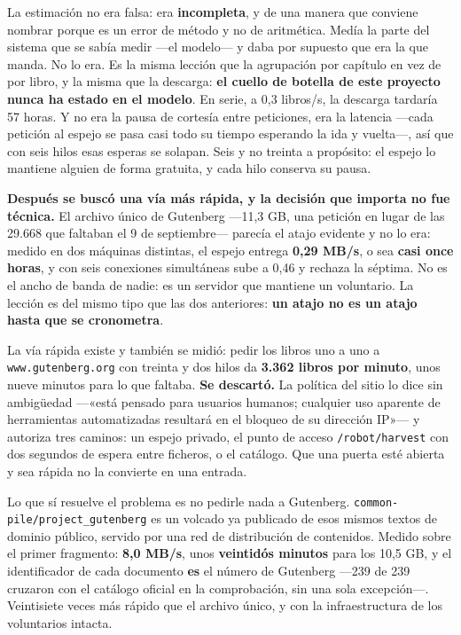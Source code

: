 \documentclass[11pt,a4paper]{article}
\begin{document}
\medskip
\noindent La estimación no era falsa: era \textbf{incompleta}, y de una manera que
conviene nombrar porque es un error de método y no de aritmética. Medía la parte del
sistema que se sabía medir —el modelo— y daba por supuesto que era la que manda. No lo
era. Es la misma lección que la agrupación por capítulo en vez de por libro, y la misma
que la descarga: \textbf{el cuello de botella de este proyecto nunca ha estado en el
modelo}. En serie, a 0,3 libros/s, la descarga tardaría 57 horas. Y no
era la pausa de cortesía entre peticiones, era la latencia —cada petición al espejo se
pasa casi todo su tiempo esperando la ida y vuelta—, así que con seis hilos esas esperas
se solapan. Seis y no treinta a propósito: el espejo lo mantiene alguien de forma gratuita,
y cada hilo conserva su pausa.

\medskip
\noindent\textbf{Después se buscó una vía más rápida, y la decisión que importa no fue
técnica.} El archivo único de Gutenberg —11,3 GB, una petición en lugar de las 29.668 que
faltaban el 9 de septiembre— parecía el atajo evidente y no lo era: medido en dos máquinas distintas, el espejo
entrega \textbf{0,29 MB/s}, o sea \textbf{casi once horas}, y con seis conexiones
simultáneas sube a 0,46 y rechaza la séptima. No es el ancho de banda de nadie: es un
servidor que mantiene un voluntario. La lección es del mismo tipo que las dos anteriores:
\textbf{un atajo no es un atajo hasta que se cronometra}.

\medskip
\noindent La vía rápida existe y también se midió: pedir los libros uno a uno a
\texttt{www.gutenberg.org} con treinta y dos hilos da \textbf{3.362 libros por minuto},
unos nueve minutos para lo que faltaba. \textbf{Se descartó.} La política del sitio lo
dice sin ambigüedad —«está pensado para usuarios humanos; cualquier uso aparente de
herramientas automatizadas resultará en el bloqueo de su dirección IP»— y autoriza tres
caminos: un espejo privado, el punto de acceso \texttt{/robot/harvest} con dos segundos de
espera entre ficheros, o el catálogo. Que una puerta esté abierta y sea rápida no la
convierte en una entrada.

\medskip
\noindent Lo que sí resuelve el problema es no pedirle nada a Gutenberg.
\texttt{common-pile/project\_gutenberg} es un volcado ya publicado \parencite{kandpal2025commonpile} de esos mismos textos
de dominio público, servido por una red de distribución de contenidos. Medido sobre el
primer fragmento: \textbf{8,0 MB/s}, unos \textbf{veintidós minutos} para los 10,5 GB, y
el identificador de cada documento \textbf{es} el número de Gutenberg —239 de 239 cruzaron
con el catálogo oficial en la comprobación, sin una sola excepción—. Veintisiete veces más
rápido que el archivo único, y con la infraestructura de los voluntarios intacta.
\end{document}
